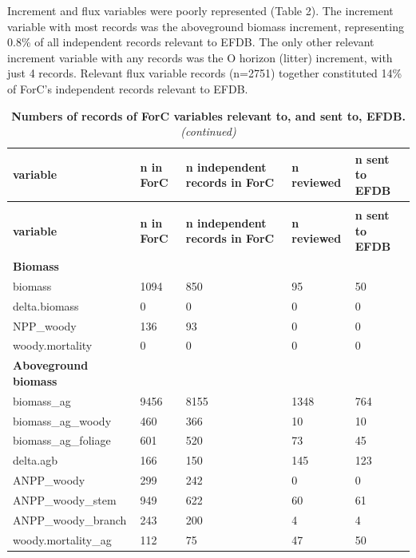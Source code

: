 \documentclass[, manuscript]{copernicus}
\begin{document}
Increment and flux variables were poorly represented (Table 2). The
increment variable with most records was the aboveground biomass
increment, representing 0.8\% of all independent records relevant to
EFDB. The only other relevant increment variable with any records was
the O horizon (litter) increment, with just 4 records. Relevant flux
variable records (n=2751) together constituted 14\% of ForC's
independent records relevant to EFDB.

\newpage
\begingroup\fontsize{8}{10}\selectfont

\begin{longtable}[t]{l|l|l|l|l}
\caption{\label{tab:table_variables}\textbf{Numbers of records of ForC variables relevant to, and sent to, EFDB.}}\\
\hline
\textbf{variable} & \textbf{n in ForC} & \textbf{n independent records in ForC} & \textbf{n reviewed} & \textbf{n sent to EFDB}\\
\hline
\endfirsthead
\caption[]{\textbf{Numbers of records of ForC variables relevant to, and sent to, EFDB.} \textit{(continued)}}\\
\hline
\textbf{variable} & \textbf{n in ForC} & \textbf{n independent records in ForC} & \textbf{n reviewed} & \textbf{n sent to EFDB}\\
\hline
\endhead
\textbf{Biomass} & \textbf{} & \textbf{} & \textbf{} & \textbf{}\\
\hline
biomass & 1094 & 850 & 95 & 50\\
\hline
delta.biomass & 0 & 0 & 0 & 0\\
\hline
NPP\_woody & 136 & 93 & 0 & 0\\
\hline
woody.mortality & 0 & 0 & 0 & 0\\
\hline
\textbf{Aboveground biomass} & \textbf{} & \textbf{} & \textbf{} & \textbf{}\\
\hline
biomass\_ag & 9456 & 8155 & 1348 & 764\\
\hline
biomass\_ag\_woody & 460 & 366 & 10 & 10\\
\hline
biomass\_ag\_foliage & 601 & 520 & 73 & 45\\
\hline
delta.agb & 166 & 150 & 145 & 123\\
\hline
ANPP\_woody & 299 & 242 & 0 & 0\\
\hline
ANPP\_woody\_stem & 949 & 622 & 60 & 61\\
\hline
ANPP\_woody\_branch & 243 & 200 & 4 & 4\\
\hline
woody.mortality\_ag & 112 & 75 & 47 & 50\\
\hline

\end{longtable}
\end{document}
